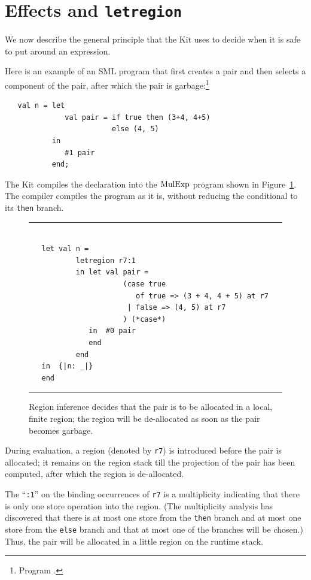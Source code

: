 \documentclass[12pt]{book}
\begin{document}
\section{Effects and {\tt letregion}}
\label{effects.sec}
We now describe the general principle that the Kit uses to decide when
it is safe to put 
%
 around an expression.

Here is an example of an SML program that first creates a pair and
then selects a component of the pair, after which the pair is
garbage:\footnote{Program .}
\begin{verbatim}
   val n = let 
              val pair = if true then (3+4, 4+5) 
                         else (4, 5)
           in 
              #1 pair
           end;
\end{verbatim}
The Kit compiles the declaration into the $\hbox{\rm MulExp}$ program shown in
Figure~\ref{elimpair.fig}.  The compiler compiles the program as it
is, without reducing the conditional to its {\tt then} branch.
\begin{figure}
\hrule
\begin{verbatim}

   let val n = 
           letregion r7:1 
           in let val pair = 
                      (case true 
                         of true => (3 + 4, 4 + 5) at r7 
                       | false => (4, 5) at r7
                      ) (*case*) 
              in  #0 pair
              end  
           end
   in  {|n: _|}
   end 
\end{verbatim}
\caption{Region inference decides that the pair is to be allocated 
  in a local, finite region; the region will be de-allocated as soon
  as the pair becomes garbage.}  \medskip

\hrule
\label{elimpair.fig}
\end{figure}
During evaluation, a region (denoted by {\tt r7}) is introduced before
the pair is allocated; it remains on the region stack till the
projection of the pair has been computed, after which the region is
de-allocated.

The ``{\tt :1}'' on the binding occurrences of {\tt r7} is a
multiplicity indicating that there is only one store operation into
the region. (The
%
multiplicity analysis has discovered that there is at most one store
from the {\tt then} branch and at most one store from the {\tt else}
branch and that at most one of the branches will be chosen.) Thus, the
pair will be allocated in a little region on the runtime stack.
\end{document}
